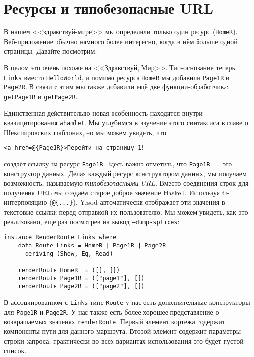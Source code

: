\section{Ресурсы и типобезопасные URL}

В нашем <<здравствуй-мире>> мы определили только один ресурс
(\lstinline!HomeR!). Веб-приложение обычно намного более интересно, когда в нём больше
одной страницы. Давайте посмотрим:

В целом это очень похоже на <<Здравствуй, Мир>>. Тип-основание теперь \lstinline!Links!
вместо \lstinline!HelloWorld!, и помимо ресурса \lstinline!HomeR! мы добавили
\lstinline!Page1R! и \lstinline!Page2R!. В связи с этим мы также добавили ещё две
функции-обработчика: \lstinline!getPage1R! и \lstinline!getPage2R!.

Единственная действительно новая особенность находится внутри квазицитирования
\lstinline'whamlet'. Мы углубимся в изучение этого синтаксиса в
\hyperref[chap:shakespeare]{главе о Шекспировских шаблонах}, но мы можем увидеть, что
\begin{lstlisting}
<a href=@{Page1R}>Перейти на страницу 1!
\end{lstlisting}
создаёт ссылку на ресурс \lstinline!Page1R!. Здесь важно отметить, что \lstinline!Page1R!~---
это конструктор данных. Делая каждый ресурс конструктором данных, мы получаем
возможность, называемую \emph{типобезопасными URL}. Вместо соединения строк для получения URL мы
создаём старое доброе значение Haskell. Используя @-интерполяцию (\lstinline!@{...}!),
Yesod автоматически отображает эти значения в текстовые ссылки перед отправкой их
пользователю. Мы можем увидеть, как это реализовано, ещё раз посмотрев на вывод
\texttt{--dump-splices}:

\begin{lstlisting}
instance RenderRoute Links where
    data Route Links = HomeR | Page1R | Page2R
      deriving (Show, Eq, Read)

    renderRoute HomeR  = ([], [])
    renderRoute Page1R = (["page1"], [])
    renderRoute Page2R = (["page2"], [])
\end{lstlisting}

В ассоциированном с \lstinline!Links! типе \lstinline!Route! у нас есть дополнительные
конструкторы для \lstinline!Page1R! и \lstinline!Page2R!. У нас также есть более хорошее
представление о возвращаемых значенях \lstinline!renderRoute!.
Первый элемент кортежа содержит
компоненты пути для данного маршрута. Второй элемент содержит параметры строки запроса;
практически во всех вариантах использования это будет пустой список.

